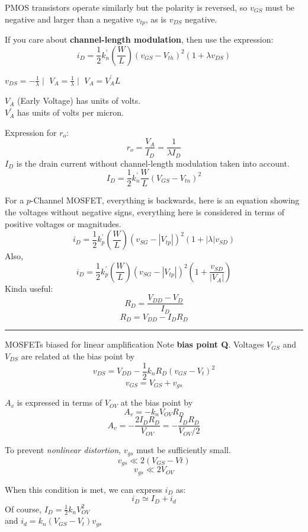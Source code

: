\documentclass[a4paper]{article}
\begin{document}
\begin{multicols}{3}
PMOS transistors operate similarly but the polarity is
reversed, so $v_{GS}$ must be negative and larger than 
a negative $v_{tp}$, as is $v_{DS}$ negative.


If you care about \textbf{channel-length modulation}, then use
the expression:
$$i_D=\frac{1}{2}k_n^{'}\left(\frac{W}{L}\right)(v_{GS}-V_{th})^2(1+\lambda v_{DS})$$

$v_{DS}=-\frac{1}{\lambda} \mid$
$V_A=\frac{1}{\lambda} \mid$
$V_A=V_A^{'}L$  

$V_A$ (Early Voltage) has units of volts.\\
$V_A^{'}$ has units of volts per micron.


Expression for $r_o$:
$$r_o=\frac{V_A}{I_D}=\frac{1}{\lambda I_D}$$
$I_D$ is the drain current without channel-length
modulation taken into account.
$$I_D=\frac{1}{2}k_n^{'}\frac{W}{L}(V_{GS}-V_{tn})^2$$

For a $p$-Channel MOSFET, everything is backwards, here is an
equation showing the voltages without negative signs, everything
here is considered in terms of positive voltages or magnitudes.
$$i_D=\frac{1}{2}k_p^{'}\left(\frac{W}{L}\right)(v_{SG}-|V_{tp}|)^2(1+|\lambda|v_{SD})$$
Also,
$$i_D=\frac{1}{2}k_p^{'}\left(\frac{W}{L}\right)(v_{SG}-|V_{tp}|)^2\left(1+\frac{v_{SD}}{|V_A|}\right)$$
Kinda useful:
$$R_D=\frac{V_{DD}-V_D}{I_D}$$
$$R_D=V_{DD}-I_D R_D$$

\hrule
\vspace{1mm}
MOSFETs biased for linear amplification
Note \textbf{bias point Q}.
Voltages $V_{GS}$ and $V_{DS}$ are related at the bias point
by 
$$v_{DS}=V_{DD}-\frac{1}{2}k_n R_D (v_{GS}-V_t)^2$$
$$v_{GS}=V_{GS}+v_{gs}$$


$A_v$ is expressed in terms of $V_{OV}$ at the bias point by
$$A_v=-k_n V_{OV} R_D$$
$$A_v=-\frac{2 I_D R_D}{V_{OV}}=-\frac{I_D R_D}{V_{OV}/2}$$

To prevent \emph{nonlinear distortion}, $v_{gs}$ must be sufficiently
small.
$$v_{gs} \ll 2(V_{GS} - V{t})$$
$$v_{gs} \ll 2V_{OV}$$

When this condition is met, we can express $i_D$ as:
$$i_D \simeq I_D + i_d$$
Of course, $I_D=\frac{1}{2}k_n V_{OV}^2$\\
and $i_d=k_n(V_{GS}-V_t)v_{gs}$


\end{multicols}
\end{document}
